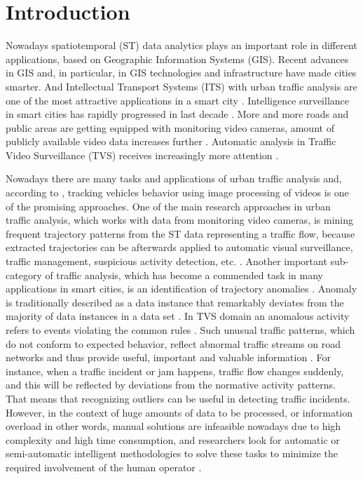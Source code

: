 \chapter{Introduction}
\label{ch:Introduction}

Nowadays spatiotemporal (ST) data analytics plays an important role in different applications, based on Geographic Information Systems (GIS). Recent advances in GIS and, in particular, in GIS technologies and infrastructure have made cities smarter. And Intellectual Transport Systems (ITS) with urban traffic analysis are one of the most attractive applications in a smart city \cite{article:2_survey_urban}. Intelligence surveillance in smart cities has rapidly progressed in last decade \cite{article:9_trb_vc_aev_sc}. More and more roads and public areas are getting equipped with monitoring video cameras, amount of publicly available video data increases further \cite{article:4_detect_eatp}. Automatic analysis in Traffic Video Surveillance (TVS) receives increasingly more attention \cite{inproceedings:21_ad_dbscan_tvs}.

Nowadays there are many tasks and applications of urban traffic analysis and, according to \cite{article:9_trb_vc_aev_sc}, tracking vehicles behavior using image processing of videos is one of the promising approaches. One of the main research approaches in urban traffic analysis, which works with data from monitoring video cameras, is mining frequent trajectory patterns from the ST data representing a traffic flow, because extracted trajectories can be afterwards applied to automatic visual surveillance, traffic management, suspicious activity detection, etc. \cite{article:5_survey_tbsa}\cite{article:over_tod}. Another important sub-category of traffic analysis, which has become a commended task in many applications in smart cities, is an identification of trajectory anomalies \cite{article:9_trb_vc_aev_sc}. Anomaly is traditionally described as a data instance that remarkably deviates from the majority of data instances in a data set \cite{article:1_survey_stdm}. In TVS domain an anomalous activity refers to events violating the common rules \cite{inproceedings:21_ad_dbscan_tvs}. Such unusual traffic patterns, which do not conform to expected behavior, reflect abnormal traffic streams on road networks and thus provide useful, important and valuable information \cite{article:9_trb_vc_aev_sc}. For instance, when a traffic incident or jam happens, traffic flow changes suddenly, and this will be reflected by deviations from the normative activity patterns. That means that recognizing outliers can be useful in detecting traffic incidents. However, in the context of huge amounts of data to be processed, or information overload in other words, manual solutions are infeasible nowadays due to high complexity and high time consumption, and researchers look for automatic or semi-automatic intelligent methodologies to solve these tasks to minimize the required involvement of the human operator \cite{article:19_gbta_ubd_is}.

